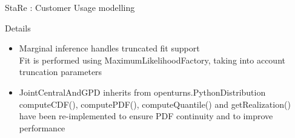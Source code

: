\documentclass{renault-template}
\begin{document}
\begin{frame}{StaRe : Customer Usage modelling}
  \begin{block}{Details}
    \begin{itemize}
    \item Marginal inference handles truncated fit support\\
      Fit is performed using MaximumLikelihoodFactory, taking into account truncation parameters
    \item JointCentralAndGPD inherits from openturns.PythonDistribution\\
      computeCDF(), computePDF(), computeQuantile() and getRealization() have been re-implemented to ensure PDF continuity and to improve performance
    \end{itemize}
  \end{block}


\end{frame}
\end{document}
